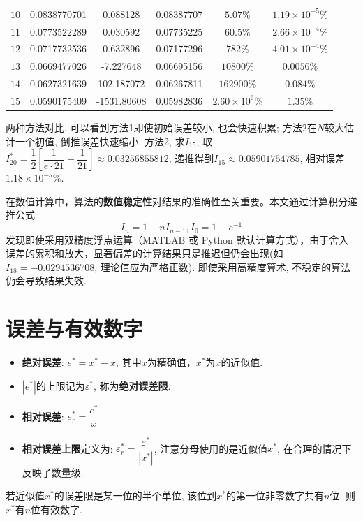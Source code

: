 \documentclass[lang=cn,newtx,12pt,scheme=chinese]{elegantbook}
\begin{document}
\begin{table}[h]
\begin{tabular}{cccccc}
		\(10\)    & 0.0838770701    & 0.088128     & 0.08387707    & \(5.07\% \) & \(1.19 \times 10^{-5}\%\) \\
		\(11\)    & 0.0773522289    & 0.030592     & 0.07735225    & \(60.5\% \) & \(2.66 \times 10^{-4}\%\) \\
		\(12\)    & 0.0717732536    & 0.632896     & 0.07177296    & \(782\% \) & \(4.01 \times 10^{-4}\%\) \\
		\(13\)    & 0.0669477026    & -7.227648    & 0.06695156    & \(10800\% \) & \(0.0056\% \) \\
		\(14\)    & 0.0627321639    & 102.187072   & 0.06267811    & \(162900\% \) & \(0.084\% \) \\
		\(15\)    & 0.0590175409    & -1531.80608  & 0.05982836    & \(2.60 \times 10^6\% \) & \(1.35\% \) \\
		\bottomrule
	\end{tabular}
\end{table}
 两种方法对比, 可以看到方法1即使初始误差较小, 也会快速积累; 方法2在$N$较大估计一个初值, 倒推误差快速缩小. 方法2, 求$I_{15}$, 取$I_{20}^*=\dfrac{1}{2}[\dfrac{1}{e\cdot21}+\dfrac{1}{21}]\approx 0.03256855812$, 递推得到$I_{15}\approx 0.05901754785$, 相对误差\(1.18 \times 10^{-5}\%\).
 
 \begin{remark}
 	在数值计算中，算法的\textbf{数值稳定性}对结果的准确性至关重要。本文通过计算积分递推公式\[ I_n=1-nI_{n-1},I_0=1-e^{-1} \]发现即使采用双精度浮点运算（MATLAB 或 Python 默认计算方式），由于舍入误差的累积和放大，显著偏差的计算结果只是推迟但仍会出现(如$I_{18}=-0.0294536708$, 理论值应为严格正数). 即使采用高精度算术, 不稳定的算法仍会导致结果失效.
 \end{remark}
\section{误差与有效数字}

\begin{itemize}
	\item \textbf{绝对误差}: $e^*=x^*-x$, 其中$x$为精确值，$x^*$为$x$的近似值.
	\item $|e^*|$的上限记为$\varepsilon^*$, 称为\textbf{绝对误差限}.
	\item \textbf{相对误差}: $e^*_r=\dfrac{e^*}{x}$
	\item \textbf{相对误差上限}定义为: $\varepsilon^*_r=\dfrac{\varepsilon^*}{|x^*|}$, 注意分母使用的是近似值$x^*$, 在合理的情况下反映了数量级.
\end{itemize}
\begin{definition}
	若近似值$x^*$的误差限是某一位的半个单位, 该位到$x^*$的第一位非零数字共有$n$位, 则$x^*$有$n$位有效数字.
\end{definition}
\end{document}
